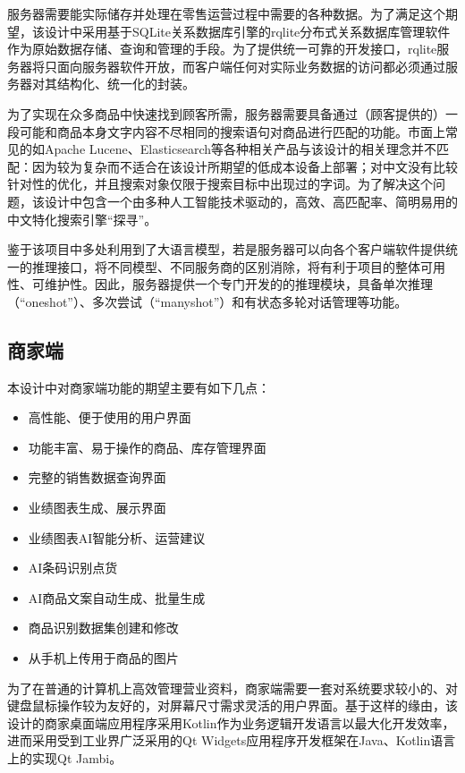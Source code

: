 服务器需要能实际储存并处理在零售运营过程中需要的各种数据。为了满足这个期望，该设计中采用基于SQLite关系数据库引擎的rqlite分布式关系数据库管理软件作为原始数据存储、查询和管理的手段。为了提供统一可靠的开发接口，rqlite服务器将只面向服务器软件开放，而客户端任何对实际业务数据的访问都必须通过服务器对其结构化、统一化的封装。

为了实现在众多商品中快速找到顾客所需，服务器需要具备通过（顾客提供的）一段可能和商品本身文字内容不尽相同的搜索语句对商品进行匹配的功能。市面上常见的如Apache Lucene、Elasticsearch等各种相关产品与该设计的相关理念并不匹配：因为较为复杂而不适合在该设计所期望的低成本设备上部署；对中文没有比较针对性的优化，并且搜索对象仅限于搜索目标中出现过的字词。为了解决这个问题，该设计中包含一个由多种人工智能技术驱动的，高效、高匹配率、简明易用的中文特化搜索引擎“探寻”。

鉴于该项目中多处利用到了大语言模型，若是服务器可以向各个客户端软件提供统一的推理接口，将不同模型、不同服务商的区别消除，将有利于项目的整体可用性、可维护性。因此，服务器提供一个专门开发的的推理模块，具备单次推理（“oneshot”）、多次尝试（“manyshot”）和有状态多轮对话管理等功能。

\subsection{商家端}

本设计中对商家端功能的期望主要有如下几点：

\begin{itemize}
    \item 高性能、便于使用的用户界面
    \item 功能丰富、易于操作的商品、库存管理界面
    \item 完整的销售数据查询界面
    \item 业绩图表生成、展示界面
    \item 业绩图表AI智能分析、运营建议
    \item AI条码识别点货
    \item AI商品文案自动生成、批量生成
    \item 商品识别数据集创建和修改
    \item 从手机上传用于商品的图片
\end{itemize}

为了在普通的计算机上高效管理营业资料，商家端需要一套对系统要求较小的、对键盘鼠标操作较为友好的，对屏幕尺寸需求灵活的用户界面。基于这样的缘由，该设计的商家桌面端应用程序采用Kotlin作为业务逻辑开发语言以最大化开发效率，进而采用受到工业界广泛采用的Qt Widgets应用程序开发框架在Java、Kotlin语言上的实现Qt Jambi。

